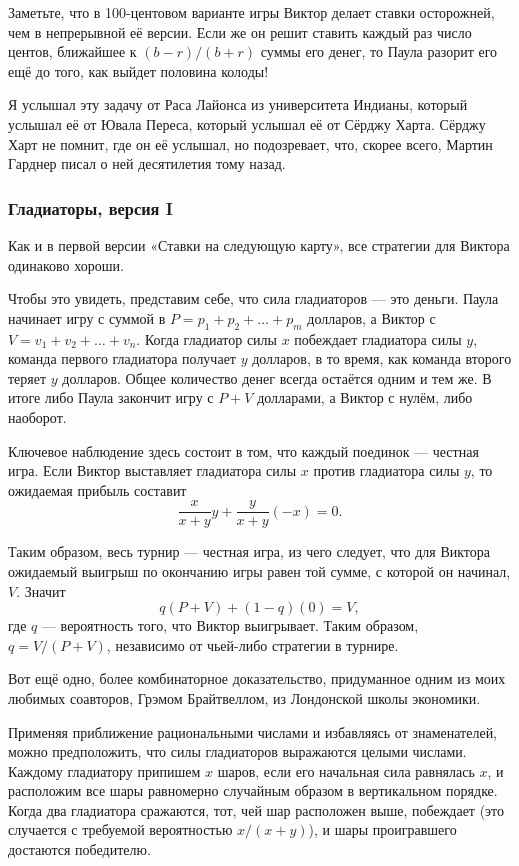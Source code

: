 Заметьте, что в 100-центовом варианте игры Виктор делает ставки осторожней, чем в непрерывной её версии.
Если же он решит ставить каждый раз число центов, ближайшее к $(b - r)/(b + r)$ суммы его денег, то Паула разорит его ещё до того, как выйдет половина колоды!

\medskip

Я услышал эту задачу от Раса Лайонса из университета Индианы, %
который услышал её от Ювала Переса, %
который услышал её от Сёрджу Харта. %
Сёрджу Харт не помнит, где он её услышал, но подозревает, что, скорее всего, Мартин Гарднер писал о ней десятилетия тому назад.

\subsubsection*{Гладиаторы, версия I}%

Как и в первой версии «Ставки на следующую карту», все стратегии для Виктора одинаково хороши.

Чтобы это увидеть, представим себе, что сила гладиаторов --- это деньги.
Паула начинает игру с суммой в $P = p_1 + p_2 + \dots + p_m$ долларов, 
а Виктор с $V = v_1 + v_2 + \dots + v_n$.
Когда гладиатор силы $x$ побеждает гладиатора силы $y$, команда первого гладиатора получает $y$ долларов, в то время, как команда второго теряет $y$ долларов.
Общее количество денег всегда остаётся одним и тем же.
В итоге либо Паула закончит игру с $P+V$ долларами, а Виктор с нулём, либо наоборот.

Ключевое наблюдение здесь состоит в том, что каждый поединок --- честная игра.
Если Виктор выставляет гладиатора силы $x$ против гладиатора силы $y$, то ожидаемая прибыль составит 
\[\frac{x}{x+y}y + \frac{y}{x+y}(-x) =0.\]

Таким образом, весь турнир --- честная игра, из чего следует, что для Виктора ожидаемый выигрыш по окончанию игры равен той сумме, с которой он начинал, $V$.
Значит
\[q(P + V) + (1-q)(0) = V,\]
где $q$ --- вероятность того, что Виктор выигрывает.
Таким образом, $q = V/(P+V)$,
независимо от чьей-либо стратегии в турнире.
\heart

Вот ещё одно, более комбинаторное доказательство, придуманное одним из моих любимых соавторов, Грэмом Брайтвеллом, из Лондонской школы экономики. %

Применяя приближение рациональными числами и избавляясь от знаменателей, можно предположить, что силы гладиаторов выражаются целыми числами.
Каждому гладиатору припишем $x$ шаров, если его начальная сила равнялась $x$, и расположим все шары равномерно случайным образом в вертикальном порядке.
Когда два гладиатора сражаются, тот, чей шар расположен выше, побеждает (это случается с требуемой вероятностью $x/(x+y)$), и шары проигравшего достаются победителю.

